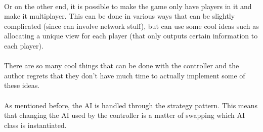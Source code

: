 \documentclass[12pt]{article}
\begin{document}
\\
Or on the other end, it is possible to make the game only have players in it and make it multiplayer. This can be done in various ways that can be slightly complicated (since can involve network stuff), but can use some cool ideas such as allocating a unique view for each player (that only outputs certain information to each player).\\
\\
There are so many cool things that can be done with the controller and the author regrets that they don't have much time to actually implement some of these ideas.\\
\\
As mentioned before, the AI is handled through the strategy pattern. This means that changing the AI used by the controller is a matter of swapping which AI class is instantiated.
\end{document}
